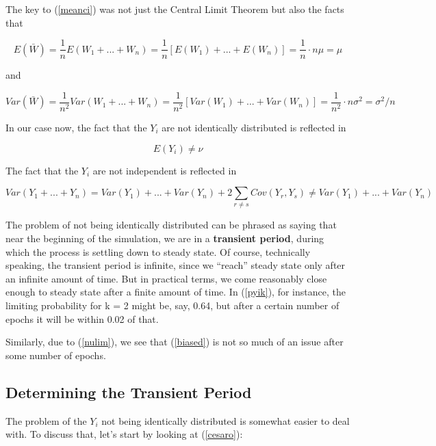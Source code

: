 The key to (\ref{meanci}) was not just the Central Limit Theorem but
also the facts that 

\begin{equation}
\label{unbmean}
E(\bar{W}) = \frac{1}{n} E(W_1+...+W_n) = \frac{1}{n}
[E(W_1)+...+E(W_n)] = \frac{1}{n} \cdot n \mu = \mu
\end{equation}

and

\begin{equation}
\label{addvar}
Var(\bar{W}) = \frac{1}{n^2} Var(W_1+...+W_n) = \frac{1}{n^2}
[Var(W_1)+...+Var(W_n)] = \frac{1}{n^2} \cdot n \sigma^2 =
\sigma^2/n
\end{equation}

In our case now, the fact that the $Y_i$ are not identically
distributed is reflected in

\begin{equation}
\label{biased}
E(Y_i) \neq \nu
\end{equation}

The fact that the $Y_i$ are not independent is reflected in

\begin{equation}
Var(Y_1+...+Y_n) = Var(Y_1)+...+Var(Y_n) + 2 \sum_{r \neq s}
Cov(Y_r,Y_s) \neq Var(Y_1)+...+Var(Y_n)
\end{equation}

The problem of not being identically distributed can be phrased as
saying that near the beginning of the simulation, we are in a {\bf
transient period}, during which the process is settling down to steady
state.  Of course, technically speaking, the transient period is
infinite, since we ``reach'' steady state only after an infinite amount
of time.  But in practical terms, we come reasonably close enough to
steady state after a finite amount of time.  In (\ref{pyik}), for
instance, the limiting probability for k = 2 might be, say, 0.64, but
after a certain number of epochs it will be within 0.02 of that.

Similarly, due to (\ref{nulim}), we see that (\ref{biased}) is not so
much of an issue after some number of epochs.

\subsection{Determining the Transient Period}

The problem of the $Y_i$ not being identically distributed is somewhat
easier to deal with.  To discuss that, let's start by looking at
(\ref{cesaro}): 

